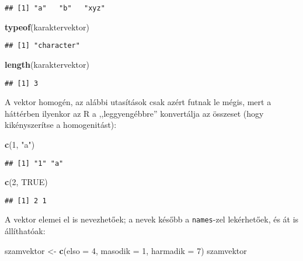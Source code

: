 \documentclass[]{book}
\newenvironment{Shaded}{\begin{snugshade}}{\end{snugshade}}
\newcommand{\KeywordTok}[1]{\textcolor[rgb]{0.13,0.29,0.53}{\textbf{#1}}}
\newcommand{\DataTypeTok}[1]{\textcolor[rgb]{0.13,0.29,0.53}{#1}}
\newcommand{\DecValTok}[1]{\textcolor[rgb]{0.00,0.00,0.81}{#1}}
\newcommand{\StringTok}[1]{\textcolor[rgb]{0.31,0.60,0.02}{#1}}
\newcommand{\OtherTok}[1]{\textcolor[rgb]{0.56,0.35,0.01}{#1}}
\newcommand{\NormalTok}[1]{#1}
\begin{document}
\begin{verbatim}
## [1] "a"   "b"   "xyz"
\end{verbatim}

\begin{Shaded}
\begin{Highlighting}[]
\KeywordTok{typeof}\NormalTok{(karaktervektor)}
\end{Highlighting}
\end{Shaded}

\begin{verbatim}
## [1] "character"
\end{verbatim}

\begin{Shaded}
\begin{Highlighting}[]
\KeywordTok{length}\NormalTok{(karaktervektor)}
\end{Highlighting}
\end{Shaded}

\begin{verbatim}
## [1] 3
\end{verbatim}

A vektor homogén, az alábbi utasítások csak azért futnak le mégis, mert
a háttérben ilyenkor az R a ,,leggyengébbre'' konvertálja az összeset
(hogy kikényszerítse a homogenitást):

\begin{Shaded}
\begin{Highlighting}[]
\KeywordTok{c}\NormalTok{(}\DecValTok{1}\NormalTok{, }\StringTok{"a"}\NormalTok{)}
\end{Highlighting}
\end{Shaded}

\begin{verbatim}
## [1] "1" "a"
\end{verbatim}

\begin{Shaded}
\begin{Highlighting}[]
\KeywordTok{c}\NormalTok{(}\DecValTok{2}\NormalTok{, }\OtherTok{TRUE}\NormalTok{)}
\end{Highlighting}
\end{Shaded}

\begin{verbatim}
## [1] 2 1
\end{verbatim}

A vektor elemei el is nevezhetőek; a nevek később a \texttt{names}-zel
lekérhetőek, és át is állíthatóak:

\begin{Shaded}
\begin{Highlighting}[]
\NormalTok{szamvektor <-}\StringTok{ }\KeywordTok{c}\NormalTok{(}\DataTypeTok{elso =} \DecValTok{4}\NormalTok{, }\DataTypeTok{masodik =} \DecValTok{1}\NormalTok{, }\DataTypeTok{harmadik =} \DecValTok{7}\NormalTok{)}
\NormalTok{szamvektor}
\end{Highlighting}
\end{Shaded}
\end{document}
